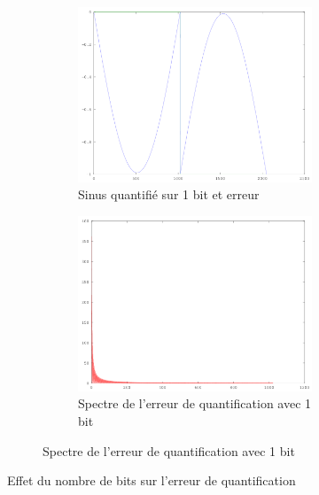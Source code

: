 \documentclass{article}
\begin{document}
\begin{figure}[h!]
	\\
	\begin{subfigure}[b]{\textwidth}
		\begin{subfigure}[b]{.45\textwidth}
			\centering
			\includegraphics[width=\textwidth]{err_quantif_1bit_t}
			\caption{Sinus quantifié sur 1 bit et erreur}
			\label{fig:q_1a}
		\end{subfigure}
		\hfill
		\begin{subfigure}[b]{.45\textwidth}
			\centering
			\includegraphics[width=\textwidth]{err_quantif_1bit_f}
			\caption{Spectre de l'erreur de quantification avec 1 bit}
			\label{fig:q_1b}
		\end{subfigure}
	\end{subfigure}	
	\caption{Effet du nombre de bits sur l'erreur de quantification}
\end{figure}
\end{document}
